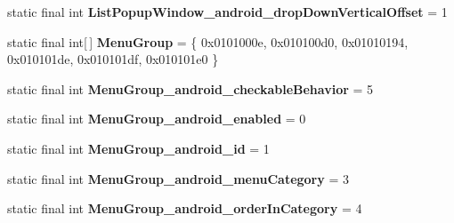 \begin{DoxyCompactItemize}
\item 
\hypertarget{classandroid_1_1support_1_1v7_1_1appcompat_1_1_r_1_1styleable_a8c66ee61979b855940af2e36f6a6a6a0}{}static final int {\bfseries List\+Popup\+Window\+\_\+android\+\_\+drop\+Down\+Vertical\+Offset} = 1\label{classandroid_1_1support_1_1v7_1_1appcompat_1_1_r_1_1styleable_a8c66ee61979b855940af2e36f6a6a6a0}

\item 
\hypertarget{classandroid_1_1support_1_1v7_1_1appcompat_1_1_r_1_1styleable_aef793c0a19e198b57791fed45ec2804e}{}static final int\mbox{[}$\,$\mbox{]} {\bfseries Menu\+Group} = \{ 0x0101000e, 0x010100d0, 0x01010194, 0x010101de, 0x010101df, 0x010101e0 \}\label{classandroid_1_1support_1_1v7_1_1appcompat_1_1_r_1_1styleable_aef793c0a19e198b57791fed45ec2804e}

\item 
\hypertarget{classandroid_1_1support_1_1v7_1_1appcompat_1_1_r_1_1styleable_a1bcc9736c90fcc22e60ad3d40e6e54ed}{}static final int {\bfseries Menu\+Group\+\_\+android\+\_\+checkable\+Behavior} = 5\label{classandroid_1_1support_1_1v7_1_1appcompat_1_1_r_1_1styleable_a1bcc9736c90fcc22e60ad3d40e6e54ed}

\item 
\hypertarget{classandroid_1_1support_1_1v7_1_1appcompat_1_1_r_1_1styleable_a01f2ab8d4d7690f5655245195aa803ce}{}static final int {\bfseries Menu\+Group\+\_\+android\+\_\+enabled} = 0\label{classandroid_1_1support_1_1v7_1_1appcompat_1_1_r_1_1styleable_a01f2ab8d4d7690f5655245195aa803ce}

\item 
\hypertarget{classandroid_1_1support_1_1v7_1_1appcompat_1_1_r_1_1styleable_aa28bf61b5e9fc2bc1caa2448356ffe73}{}static final int {\bfseries Menu\+Group\+\_\+android\+\_\+id} = 1\label{classandroid_1_1support_1_1v7_1_1appcompat_1_1_r_1_1styleable_aa28bf61b5e9fc2bc1caa2448356ffe73}

\item 
\hypertarget{classandroid_1_1support_1_1v7_1_1appcompat_1_1_r_1_1styleable_a72c3459b8e89065ee52e7671aa730693}{}static final int {\bfseries Menu\+Group\+\_\+android\+\_\+menu\+Category} = 3\label{classandroid_1_1support_1_1v7_1_1appcompat_1_1_r_1_1styleable_a72c3459b8e89065ee52e7671aa730693}

\item 
\hypertarget{classandroid_1_1support_1_1v7_1_1appcompat_1_1_r_1_1styleable_a7506eb5fe31e003b3fae2058ac082d38}{}static final int {\bfseries Menu\+Group\+\_\+android\+\_\+order\+In\+Category} = 4\label{classandroid_1_1support_1_1v7_1_1appcompat_1_1_r_1_1styleable_a7506eb5fe31e003b3fae2058ac082d38}


\end{DoxyCompactItemize}
